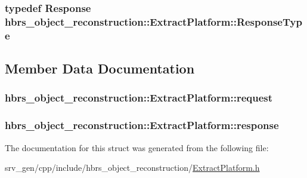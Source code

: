 \hypertarget{structhbrs__object__reconstruction_1_1_extract_platform_ab723bf3001138486f42d752c8fa7b63e}{
\subsubsection[{\-Response\-Type}]{\setlength{\rightskip}{0pt plus 5cm}typedef {\bf \-Response} {\bf hbrs\-\_\-object\-\_\-reconstruction\-::\-Extract\-Platform\-::\-Response\-Type}}}\label{structhbrs__object__reconstruction_1_1_extract_platform_ab723bf3001138486f42d752c8fa7b63e}


\subsection{\-Member \-Data \-Documentation}
\hypertarget{structhbrs__object__reconstruction_1_1_extract_platform_aa72c3c4626216b4bdce1cf1257dddc80}{
\subsubsection[{request}]{ {\bf hbrs\-\_\-object\-\_\-reconstruction\-::\-Extract\-Platform\-::request}}}\label{structhbrs__object__reconstruction_1_1_extract_platform_aa72c3c4626216b4bdce1cf1257dddc80}
\hypertarget{structhbrs__object__reconstruction_1_1_extract_platform_a569767d4fac8c0bd3cd9cf9addf397d4}{
\subsubsection[{response}]{ {\bf hbrs\-\_\-object\-\_\-reconstruction\-::\-Extract\-Platform\-::response}}}\label{structhbrs__object__reconstruction_1_1_extract_platform_a569767d4fac8c0bd3cd9cf9addf397d4}


\-The documentation for this struct was generated from the following file\-:\begin{DoxyCompactItemize}
\item 
srv\-\_\-gen/cpp/include/hbrs\-\_\-object\-\_\-reconstruction/\hyperlink{_extract_platform_8h}{\-Extract\-Platform.\-h}\end{DoxyCompactItemize}
